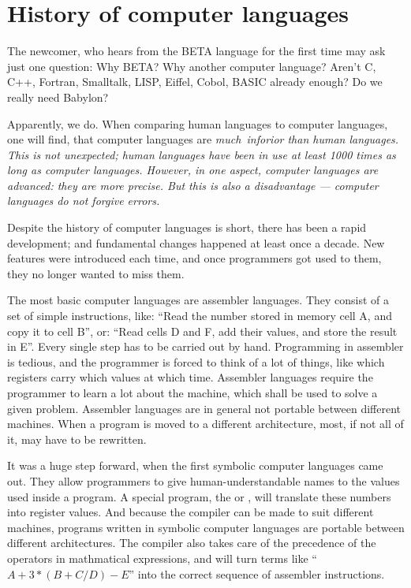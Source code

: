 \section{History of computer languages}
The newcomer, who hears from the BETA language for the first time
may ask just one question: Why BETA?  Why another computer
language?  Aren't C, C++, Fortran, Smalltalk, LISP, Eiffel,
Cobol, BASIC already enough?  Do we really need Babylon?

Apparently, we do.  When comparing human languages to computer
languages, one will find, that computer languages are \em
much\em\/\ inforior than human languages.  This is not
unexpected; human languages have been in use at least 1000 times
as long as computer languages.  However, in one aspect, computer
languages are advanced: they are more precise.  But this is also
a disadvantage --- computer languages do not forgive errors.

Despite the history of computer languages is short, there has
been a rapid development; and fundamental changes happened at
least once a decade.  New features were introduced each time,
and once programmers got used to them, they no longer wanted
to miss them.

The most basic computer languages are assembler languages.  They
consist of a set of simple instructions, like: ``Read the number
stored in memory cell A, and copy it to cell B'', or: ``Read cells
D and F, add their values, and store the result in E''.  Every
single step has to be carried out by hand.  Programming in
assembler is tedious, and the programmer is forced to think of
a lot of things, like which registers carry which values at which
time.  Assembler languages require the programmer to learn a lot
about the machine, which shall be used to solve a given problem.
Assembler languages are in general not portable between different
machines.  When a program is moved to a different architecture,
most, if not all of it, may have to be rewritten.

It was a huge step forward, when the first symbolic computer
languages came out.  They allow programmers to give
human-understandable names to the values used inside a program.
A special program, the  or , will
translate these numbers into register values.  And because the
compiler can be made to suit different machines, programs written
in symbolic computer languages are portable between different
architectures.  The compiler also takes care of the precedence
of the operators in mathmatical expressions, and will turn
terms like ``$A + 3*(B+C/D) - E$'' into the correct sequence of
assembler instructions.

